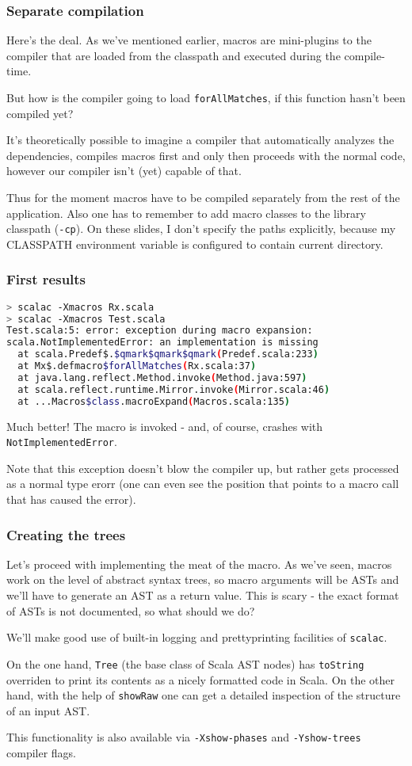 \documentclass[hyperref={bookmarks=false}]{beamer}
\begin{document}
\begin{frame}[t,fragile]
\frametitle{Separate compilation}
Here's the deal. As we've mentioned earlier, macros are mini-plugins to the compiler that are loaded from the classpath and executed during the compile-time.

But how is the compiler going to load \texttt{forAllMatches}, if this function hasn't been compiled yet?

It's theoretically possible to imagine a compiler that automatically analyzes the dependencies, compiles macros first and only then proceeds with the normal code, however our compiler isn't (yet) capable of that.

Thus for the moment macros have to be compiled separately from the rest of the application. Also one has to remember to add macro classes to the library classpath (\texttt{-cp}). On these slides, I don't specify the paths explicitly, because my CLASSPATH environment variable is configured to contain current directory.
\end{frame}

\begin{frame}[t,fragile]
\frametitle{First results}

\begin{lstlisting}[language=bash]
> scalac -Xmacros Rx.scala
> scalac -Xmacros Test.scala
Test.scala:5: error: exception during macro expansion:
scala.NotImplementedError: an implementation is missing
  at scala.Predef$.$qmark$qmark$qmark(Predef.scala:233)
  at Mx$.defmacro$forAllMatches(Rx.scala:37)
  at java.lang.reflect.Method.invoke(Method.java:597)
  at scala.reflect.runtime.Mirror.invoke(Mirror.scala:46)
  at ...Macros$class.macroExpand(Macros.scala:135)
\end{lstlisting}%

Much better! The macro is invoked - and, of course, crashes with \texttt{NotImplementedError}.

Note that this exception doesn't blow the compiler up, but rather gets processed as a normal type erorr (one can even see the position that points to a macro call that has caused the error).
\end{frame}

\begin{frame}[t,fragile]
\frametitle{Creating the trees}
Let's proceed with implementing the meat of the macro. As we've seen, macros work on the level of abstract syntax trees, so macro arguments will be ASTs and we'll have to generate an AST as a return value. This is scary - the exact format of ASTs is not documented, so what should we do?

We'll make good use of built-in logging and prettyprinting facilities of \texttt{scalac}.

On the one hand, \texttt{Tree} (the base class of Scala AST nodes) has \texttt{toString} overriden to print its contents as a nicely formatted code in Scala. On the other hand, with the help of \texttt{showRaw} one can get a detailed inspection of the structure of an input AST.

This functionality is also available via \texttt{-Xshow-phases} and \texttt{-Yshow-trees} compiler flags.
\end{frame}
\end{document}
